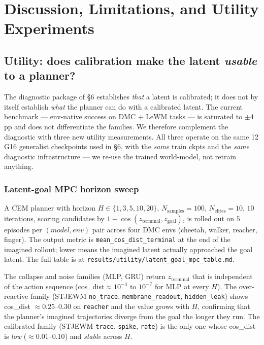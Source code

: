 \documentclass{article}
\begin{document}
\section{Discussion, Limitations, and Utility Experiments}

\subsection{Utility: does calibration make the latent \emph{usable} to a planner?}

The diagnostic package of §6 establishes \emph{that} a latent is calibrated; it
does not by itself establish \emph{what} the planner can do with a calibrated
latent. The current benchmark --- env-native success on DMC + LeWM tasks
--- is saturated to $\pm 4$pp and does not differentiate the families.
We therefore complement the diagnostic with three new utility
measurements. All three operate on the same 12 G16 generalist
checkpoints used in §6, with the \emph{same} train ckpts and the \emph{same}
diagnostic infrastructure --- we re-use the trained world-model, not
retrain anything.

\subsubsection{Latent-goal MPC horizon sweep}

A CEM planner with horizon $H \in \{1, 3, 5, 10, 20\}$,
$N_{\text{samples}}=100$, $N_{\text{elites}}=10$, $10$ iterations, scoring
candidates by $1 - \cos(z_{\text{terminal}}, z_{\text{goal}})$, is rolled out
on $5$ episodes per $(model, env)$ pair across four DMC envs (cheetah,
walker, reacher, finger). The output metric is
\texttt{mean\_cos\_dist\_terminal} at the end of the imagined rollout; lower
means the imagined latent actually approached the goal latent. The
full table is at \texttt{results/utility/latent\_goal\_mpc\_table.md}.

The collapse and noise families (MLP, GRU) return $z_{\text{terminal}}$
that is independent of the action sequence (cos\_dist$\approx 10^{-4}$
to $10^{-7}$ for MLP at every $H$). The over-reactive family (STJEWM
\texttt{no\_trace}, \texttt{membrane\_readout}, \texttt{hidden\_leak}) shows
cos\_dist $\approx 0.25$--$0.30$ on \texttt{reacher} and the value grows with $H$,
confirming that the planner's imagined trajectories diverge from the
goal the longer they run. The calibrated family (STJEWM \texttt{trace},
\texttt{spike}, \texttt{rate}) is the only one whose cos\_dist is \emph{low}
($\approx 0.01$--$0.10$) and \emph{stable} across $H$.
\end{document}
